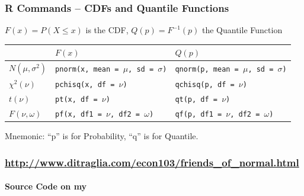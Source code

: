 \documentclass[handout]{beamer}
\begin{document}
\begin{frame}
\frametitle{R Commands -- CDFs and Quantile Functions}
$F(x) = P(X\leq x)$ is the CDF, $Q(p) = F^{-1}(p)$ the Quantile Function
\footnotesize
\begin{table}
\begin{tabular}{l|ll}
&$F(x)$&$Q(p)$\\
\hline
$N(\mu,\sigma^2)$ &\texttt{pnorm(x, mean = $\mu$,  sd = $\sigma$)}&\texttt{qnorm(p, mean = $\mu$,  sd = $\sigma$)}\\
$\chi^2(\nu)$&\texttt{pchisq(x, df = $\nu$)}&\texttt{qchisq(p, df = $\nu$)}\\
$t(\nu)$&\texttt{pt(x, df = $\nu$)}&\texttt{qt(p, df = $\nu$)}\\
$F(\nu,\omega)$&\texttt{pf(x, df1 = $\nu$, df2 = $\omega$)}&\texttt{qf(p, df1 = $\nu$, df2 = $\omega$)}
\end{tabular}
\end{table}
\vspace{1em}
\normalsize
\alert{Mnemonic: ``p'' is for Probability, ``q'' is for Quantile.}

\end{frame}
\begin{frame}
	\frametitle{\href{http://www.ditraglia.com/econ103/friends_of_normal.html}{http://www.ditraglia.com/econ103/friends\_of\_normal.html}}
\framesubtitle{Source Code on my \href{https://gist.github.com/fditraglia/7121684}{}}



\begin{figure}
\end{figure}

\end{frame}
\end{document}
